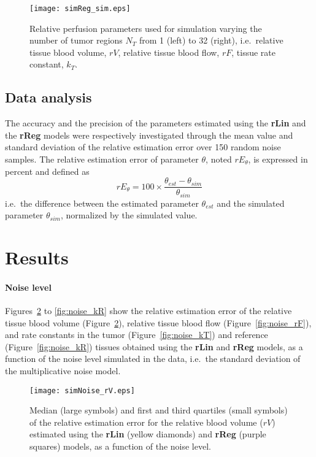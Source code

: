 \begin{figure}
\texttt{[image: simReg\_sim.eps]}
\caption{Relative perfusion parameters used for simulation varying the number of tumor regions $N_T$ from 1 (left) to 32 (right), i.e.~relative tissue blood volume, $rV$, relative tissue blood flow, $rF$, tissue rate constant, $k_T$.}
\label{fig:simReg}
\end{figure}

\subsection{Data analysis}\label{sec:dataAnalysis}
The accuracy and the precision of the parameters estimated using the \textbf{rLin} and the \textbf{rReg} models were respectively investigated through the mean value and standard deviation of the relative estimation error over 150 random noise samples.
The relative estimation error of parameter $\theta$, noted $rE_{\theta}$, is expressed in percent and defined as
\begin{equation}
rE_{\theta} = 100 \times \frac{\theta_{est}-\theta_{sim}}{\theta_{sim}}
\end{equation}
i.e.~the difference between the estimated parameter $\theta_{est}$ and the simulated parameter $\theta_{sim}$, normalized by the simulated value.

\section{Results}
\paragraph{Noise level}
Figures~\ref{fig:noise_rV} to \ref{fig:noise_kR} show the relative estimation error of the relative tissue blood volume (Figure~\ref{fig:noise_rV}), relative tissue blood flow (Figure~\ref{fig:noise_rF}), and rate constants in the tumor (Figure~\ref{fig:noise_kT}) and reference  (Figure~\ref{fig:noise_kR}) tissues obtained using the \textbf{rLin} and \textbf{rReg} models, as a function of the noise level simulated in the data, i.e.~the standard deviation of the multiplicative noise model.

\begin{figure}
\texttt{[image: simNoise\_rV.eps]}
\caption{Median (large symbols) and first and third quartiles (small symbols) of the relative estimation error for the relative blood volume ($rV$) estimated using the \textbf{rLin} (yellow diamonds) and \textbf{rReg} (purple squares) models, as a function of the noise level.}
\label{fig:noise_rV}
\end{figure}

